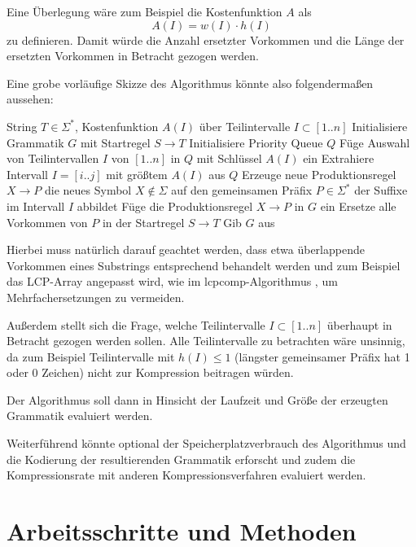Eine Überlegung wäre zum Beispiel die Kostenfunktion $A$ als 
\begin{equation*}
    A(I) = w(I) \cdot h(I)
\end{equation*}
zu definieren. Damit würde die Anzahl ersetzter Vorkommen und die Länge der ersetzten Vorkommen in Betracht gezogen werden.  

Eine grobe vorläufige Skizze des Algorithmus könnte also folgendermaßen aussehen:\\
\begin{algorithmic}[1]
    \REQUIRE String $T \in \Sigma^*$, Kostenfunktion $A(I)$ über Teilintervalle $I \subset [1..n]$
    \STATE Initialisiere Grammatik $G$ mit Startregel $S \rightarrow T$
    \STATE Initialisiere Priority Queue $Q$
    \STATE Füge Auswahl von Teilintervallen $I$ von $[1..n]$ in $Q$ mit Schlüssel $A(I)$ ein
        \STATE Extrahiere Intervall $I = [i..j]$ mit größtem $A(I)$ aus $Q$
        \STATE Erzeuge neue Produktionsregel $X \rightarrow P$ die neues Symbol $X \notin \Sigma$ auf den gemeinsamen Präfix $P \in \Sigma^*$ der Suffixe im Intervall $I$ abbildet
        \STATE Füge die Produktionsregel $X \rightarrow P$ in $G$ ein
        \STATE Ersetze alle Vorkommen von $P$ in der Startregel $S \rightarrow T$
    \ENDWHILE
    \STATE Gib $G$ aus
\end{algorithmic}

Hierbei muss natürlich darauf geachtet werden, dass etwa überlappende Vorkommen eines Substrings entsprechend behandelt werden und zum Beispiel das LCP-Array angepasst wird, wie im lcpcomp-Algorithmus \cite{dinklage_compression_2017}, um Mehrfachersetzungen zu vermeiden.

Außerdem stellt sich die Frage, welche Teilintervalle $I \subset [1..n]$ überhaupt in Betracht gezogen werden sollen. Alle Teilintervalle zu betrachten wäre unsinnig, da zum Beispiel Teilintervalle mit $h(I) \leq 1$ (längster gemeinsamer Präfix hat 1 oder 0 Zeichen) nicht zur Kompression beitragen würden.

Der Algorithmus soll dann in Hinsicht der Laufzeit und Größe der erzeugten Grammatik evaluiert werden. 

Weiterführend könnte optional der Speicherplatzverbrauch des Algorithmus und die Kodierung der resultierenden Grammatik erforscht \cite{tabei_succinct_2013} und zudem die Kompressionsrate mit anderen Kompressionsverfahren evaluiert werden. 

\section{Arbeitsschritte und Methoden}

